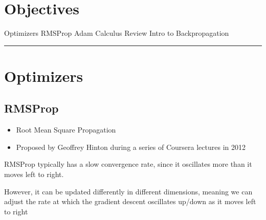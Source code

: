 
\section*{Objectives}
\begin{outline}
    \1 Optimizers
    \2 RMSProp
    \2 Adam
    \1 Calculus Review
    \1 Intro to Backpropagation
\end{outline}

\rule[0.0051in]{\textwidth}{0.00025in}
\section{Optimizers}
\subsection{RMSProp}

\begin{itemize}
    \item Root Mean Square Propagation
    \item Proposed by Geoffrey Hinton during a series of Coursera lectures in 2012
\end{itemize}
RMSProp typically has a slow convergence rate, since it oscillates more than it moves left to right.

However, it can be updated differently in different dimensions, meaning we can adjust the rate at which the gradient descent oscillates up/down as it moves left to right

\begin{center}
\end{center}


